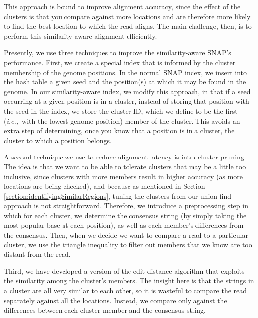 \documentclass[twocolumn,10pt]{article}
\newcommand{\ie}{{\em i.e.,}~}
\begin{document}
This approach is bound to improve alignment accuracy, since the effect of the clusters is that you compare against more locations and are therefore more likely to find the best location to which the read aligns.  The main challenge, then, is to perform this similarity-aware alignment efficiently.  

Presently, we use three techniques to improve the similarity-aware SNAP's performance.  First, we create a special index that is informed by the cluster membership of the genome positions.  In the normal SNAP index, we insert into the hash table a given seed and the position(s) at which it may be found in the genome.  In our similarity-aware index, we modify this approach, in that if a seed occurring at a given position is in a cluster, instead of storing that position with the seed in the index, we store the cluster ID, which we define to be the first (\ie with the lowest genome position) member of the cluster.  This avoids an extra step of determining, once you know that a position is in a cluster, the cluster to which a position belongs.

A second technique we use to reduce alignment latency is intra-cluster pruning.  The idea is that we want to be able to tolerate clusters that may be a little too inclusive, since clusters with more members result in higher accuracy (as more locations are being checked), and because as mentioned in Section \ref{section:identifyingSimilarRegions}, tuning the clusters from our union-find approach is not straightforward.  Therefore, we introduce a preprocessing step in which for each cluster, we determine the consensus string (by simply taking the most popular base at each position), as well as each member's differences from the consensus.  Then, when we decide we want to compare a read to a particular cluster, we use the triangle inequality to filter out members that we know are too distant from the read.  

Third, we have developed a version of the edit distance algorithm that exploits the similarity among the cluster's members.  The insight here is that the strings in a cluster are all very similar to each other, so it is wasteful to compare the read separately against all the locations.  Instead, we compare only against the differences between each cluster member and the consensus string.
\end{document}
